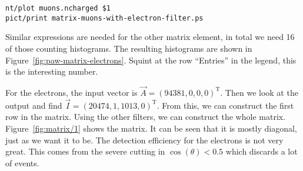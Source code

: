 \documentclass[11pt, english, fleqn, DIV=15, headinclude, BCOR=2cm]{scrreprt}
\begin{document}
\begin{lstlisting}
nt/plot muons.ncharged $1
pict/print matrix-muons-with-electron-filter.ps
\end{lstlisting}

Similar expressions are needed for the other matrix element, in total we need
16 of those counting histograms. The resulting histograms are shown in
Figure~\ref{fig:paw-matrix-electrons}. Squint at the row \enquote{Entries} in
the legend, this is the interesting number.

For the electrons, the input vector is $\vec A = (94381, 0, 0,
0)^\mathrm T$. Then we look at the output and find $\vec I = (20474, 1, 1013,
0)^\mathrm T$. From this, we can construct the first row in the matrix. Using
the other filters, we can construct the whole matrix. Figure~\ref{fig:matrix/1}
shows the matrix. It can be seen that it is mostly diagonal, just as we want it
to be. The detection efficiency for the electrons is not very great. This comes
from the severe cutting in $\cos(\theta) < 0.5$ which discards a lot of events.

\end{document}
